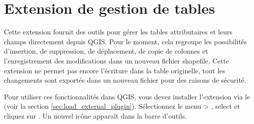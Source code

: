 \section{Extension de gestion de tables}\label{sec:ftools}

Cette extension fournit des outils pour gérer les tables attributaires et leurs champs directement depuis QGIS. Pour le moment, cela regroupe les possibilités d'insertion, de suppression, de déplacement, de copie de colonnes et l'enregistrement des modifications dans un nouveau fichier shapefile. Cette extension ne permet pas encore l'écriture dans la table originelle, tout les changements sont exportés dans un nouveau fichier pour des raisons de sécurité.


Pour utiliser ces fonctionnalités dans QGIS, vous devez installer l'extension via le\\  (voir la section 
\ref{sec:load_external_plugin}). Sélectionnez le menu  > , select  et cliquez sur . Un nouvel icône  apparaît dans la barre d'outils.
